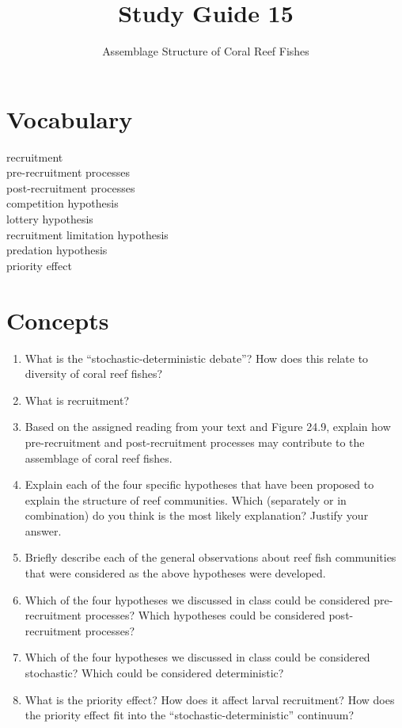 \documentclass[letterpaper]{tufte-handout}
\title{Study Guide 15}
\author{Assemblage Structure of Coral Reef Fishes}
\date{} %
\begin{document}
\maketitle	%


\section{Vocabulary} 
\vspace{-1\baselineskip}
\begin{multicols}{2}
recruitment \\
pre-recruitment processes \\
post-recruitment processes \\
competition hypothesis \\
lottery hypothesis \\
recruitment limitation hypothesis \\
predation hypothesis \\
priority effect
\end{multicols}

\section{Concepts}

\begin{enumerate}
	\item What is the ``stochastic-deterministic debate''? How does this relate to diversity of coral reef fishes?

	\item What is recruitment?
	
	\item Based on the assigned reading from your text and Figure 24.9, explain how pre-recruitment and post-recruitment processes may contribute to the assemblage of coral reef fishes.
	
	\item Explain each of the four specific hypotheses that have been proposed to explain the structure of reef communities.  Which (separately or in combination) do you think is the most likely explanation?  Justify your answer.

	\item Briefly describe each of the general observations about reef fish communities that were considered as the above hypotheses were developed.
	
	\item Which of the four hypotheses we discussed in class could be considered pre-recruitment processes? Which hypotheses could be considered post-recruitment processes?
	
	\item Which of the four hypotheses we discussed in class could be considered stochastic?  Which could be considered deterministic?
	
	\item What is the priority effect? How does it affect larval recruitment? How does the priority effect fit into the ``stochastic-deterministic'' continuum?
	
\end{enumerate}
\end{document}
